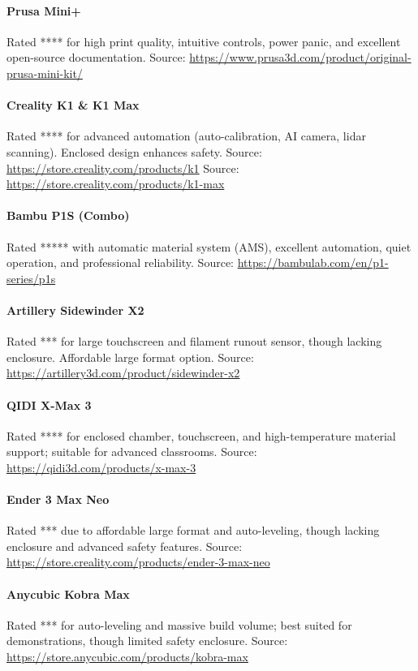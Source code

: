 \paragraph{Prusa Mini+}  
Rated **** for high print quality, intuitive controls, power panic, and excellent open-source documentation.  
Source: \url{https://www.prusa3d.com/product/original-prusa-mini-kit/}

\paragraph{Creality K1 \& K1 Max}  
Rated **** for advanced automation (auto-calibration, AI camera, lidar scanning). Enclosed design enhances safety.  
Source: \url{https://store.creality.com/products/k1}  
Source: \url{https://store.creality.com/products/k1-max}

\paragraph{Bambu P1S (Combo)}  
Rated ***** with automatic material system (AMS), excellent automation, quiet operation, and professional reliability.  
Source: \url{https://bambulab.com/en/p1-series/p1s}

\paragraph{Artillery Sidewinder X2}  
Rated *** for large touchscreen and filament runout sensor, though lacking enclosure. Affordable large format option.  
Source: \url{https://artillery3d.com/product/sidewinder-x2}

\paragraph{QIDI X-Max 3}  
Rated **** for enclosed chamber, touchscreen, and high-temperature material support; suitable for advanced classrooms.  
Source: \url{https://qidi3d.com/products/x-max-3}

\paragraph{Ender 3 Max Neo}  
Rated *** due to affordable large format and auto-leveling, though lacking enclosure and advanced safety features.  
Source: \url{https://store.creality.com/products/ender-3-max-neo}

\paragraph{Anycubic Kobra Max}  
Rated *** for auto-leveling and massive build volume; best suited for demonstrations, though limited safety enclosure.  
Source: \url{https://store.anycubic.com/products/kobra-max}

